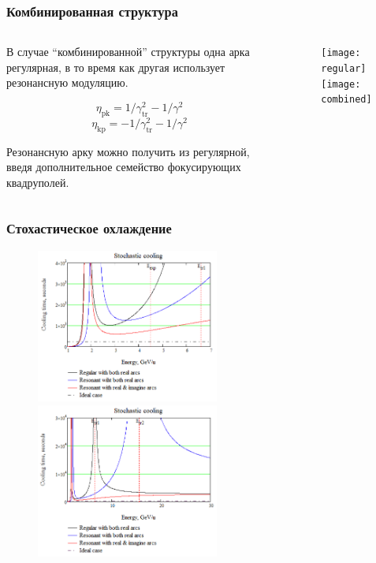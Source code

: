 \begin{frame}
	\frametitle{Комбинированная структура}
\begin{columns}[t]
        \begin{column}{0.5\textwidth}
\par В случае “комбинированной” структуры одна арка регулярная, в то время как другая использует резонансную модуляцию.

\small \begin{equation}        
\eta_{\text{pk}}=1/\gamma_{\text{tr}}^2-1/\gamma^2
\end{equation} \normalsize 
\small \begin{equation}        
\eta_{\text{kp}}=-1/\gamma_{\text{tr}}^2-1/\gamma^2
\end{equation} \normalsize 

\par Резонансную арку можно получить из регулярной, введя дополнительное семейство фокусирующих квадруполей.

        \end{column}
        \begin{column}{0.5\textwidth}
            \begin{figure}[t]
                \centering
                \texttt{[image: regular]}
                \texttt{[image: combined]}
                \label{fig:structures}
            \end{figure}
        \end{column}
    \end{columns}
\end{frame}

\begin{frame}
	\frametitle{Стохастическое охлаждение}
	\begin{figure}[h!]
		\includegraphics[width=6cm]{images/SC}
		\includegraphics[width=6cm]{images/SC_wide}
                \label{Figure 1}
	\end{figure}
\end{frame}


